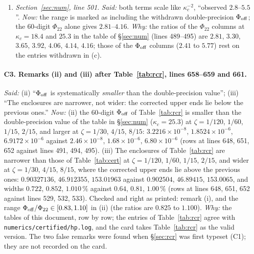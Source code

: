 \documentclass[11pt]{article}
\begin{document}
\begin{enumerate}[label=(\alph*),leftmargin=2.4em]
 $116.4$, $117.7$, $117.6$, $119.8$, $147.9$, $152.5$, i.e.\ $116$--$153$ within the rounding of
 the printed widths.
\item \emph{Section~\ref{sec:num}, line 501.}  \emph{Said:} both terms scale like
 $\kappa_c^{-2}$, ``observed $2.8$--$5.5$''.  \emph{Now:} the range is marked as including the
 withdrawn double-precision $\Phi_{\rm off}$; the $60$-digit $\Phi_{22}$ alone gives
 $2.81$--$4.16$.  \emph{Why:} the ratios of the $\Phi_{22}$ columns at $\kappa_c=18.4$ and $25.3$
 in the table of \S\ref{sec:num} (lines 489--495) are $2.81$, $3.30$, $3.65$, $3.92$, $4.06$,
 $4.14$, $4.16$; those of the $\Phi_{\rm off}$ columns ($2.41$ to $5.77$) rest on the entries
 withdrawn in (c).
\end{enumerate}

\paragraph{C3. Remarks (ii) and (iii) after Table~\ref{tab:rcr}, lines 658--659 and 661.}
\emph{Said:} (ii) ``$\Phi_{\rm off}$ is systematically \emph{smaller} than the double-precision
value''; (iii) ``The enclosures are narrower, not wider: the corrected upper ends lie below the
previous ones.''  \emph{Now:} (ii) the $60$-digit $\Phi_{\rm off}$ of Table~\ref{tab:rcr} is smaller
than the double-precision value of the table in \S\ref{sec:num} ($\kappa_c=25.3$) at
$\zeta=1/120$, $1/60$, $1/15$, $2/15$, and larger at $\zeta=1/30$, $4/15$, $8/15$:
$3.2216\times10^{-8}$, $1.8524\times10^{-6}$, $6.9172\times10^{-6}$ against $2.46\times10^{-8}$,
$1.68\times10^{-6}$, $6.80\times10^{-6}$ (rows at lines 648, 651, 652 against lines 491, 494, 495).
(iii) The enclosures of Table~\ref{tab:rcr} are narrower than those of Table~\ref{tab:cert} at
$\zeta=1/120$, $1/60$, $1/15$, $2/15$, and wider at $\zeta=1/30$, $4/15$, $8/15$, where the
corrected upper ends lie above the previous ones: $0.90327136$, $46.912355$, $153.01963$ against
$0.902504$, $46.89415$, $153.0065$, and widths $0.722$, $0.852$, $1.010\,\%$ against $0.64$,
$0.81$, $1.00\,\%$ (rows at lines 648, 651, 652 against lines 529, 532, 533).  Checked and right
as printed: remark (i), and the range $\Phi_{\rm off}/\Phi_{22}\in[0.83,1.10]$ in (ii) (the ratios
are $0.825$ to $1.100$).  \emph{Why:} the tables of this document, row by row; the entries of
Table~\ref{tab:rcr} agree with \texttt{numerics/certified/hp.log}, and the card takes
Table~\ref{tab:rcr} as the valid version.  The two false remarks were found when \S\ref{sec:rcr}
was first typeset (C1); they are not recorded on the card.
\end{document}
